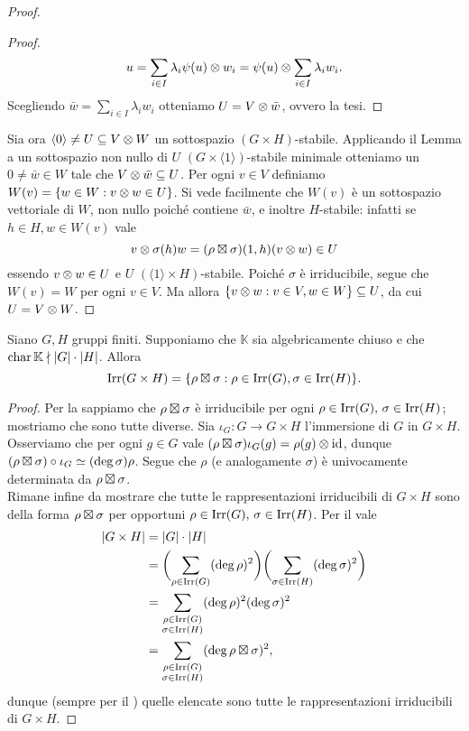 \begin{proof}
\begin{proof}
$$
u=\sum_{i\in I}\lambda_i\psi(u)\otimes w_i=\psi(u)\otimes\sum_{i\in I}\lambda_i w_i.
$$
Scegliendo $\bar{w}=\sum_{i\in I}\lambda_i w_i$ otteniamo $U=V\otimes\bar{w}$, ovvero la tesi.
\end{proof}
Sia ora $\langle0\rangle\neq U\subseteq V\otimes W$ un sottospazio $(G\times H)$-stabile. Applicando il Lemma a un sottospazio non nullo di $U$ $(G\times\langle1\rangle)$-stabile minimale otteniamo un $0\neq\bar{w}\in W$ tale che $V\otimes\bar{w}\subseteq U$. Per ogni $v\in V$ definiamo $W(v)=\{w\in W:v\otimes w\in U\}$. Si vede facilmente che $W(v)$ è un sottospazio vettoriale di $W$, non nullo poiché contiene $\bar{w}$, e inoltre $H$-stabile: infatti se $h\in H\comma w\in W(v)$ vale
$$
v\otimes\sigma(h)w=(\rho\boxtimes\sigma)(1,h)(v\otimes w)\in U
$$
essendo $v\otimes w\in U$ e $U$ $(\langle1\rangle\times H)$-stabile. Poiché $\sigma$ è irriducibile, segue che $W(v)=W$ per ogni $v\in V$. Ma allora $\{v\otimes w:v\in V,w\in W\}\subseteq U$, da cui $U=V\otimes W$.
\end{proof}

\begin{corollary}
Siano $G\comma H$ gruppi finiti. Supponiamo che $\mathbb{K}$ sia algebricamente chiuso e che $\operatorname{char}\mathbb{K}\nmid|G|\cdot|H|$. Allora
$$
\operatorname{Irr}(G\times H)=\{\rho\boxtimes\sigma:\rho\in\operatorname{Irr}(G),\sigma\in\operatorname{Irr}(H)\}.
$$
\end{corollary}
\begin{proof}
Per la  sappiamo che $\rho\boxtimes\sigma$ è irriducibile per ogni $\rho\in\operatorname{Irr}(G),\,\allowbreak\sigma\in\operatorname{Irr}(H)$; mostriamo che sono tutte diverse. Sia $\iota_G:G\to G\times H$ l'immersione di $G$ in $G\times H$. Osserviamo che per ogni $g\in G$ vale $(\rho\boxtimes\sigma)\iota_G(g)=\rho(g)\otimes\operatorname{id}$, dunque $(\rho\boxtimes\sigma)\circ\iota_G\simeq(\deg\sigma)\rho$. Segue che $\rho$ (e analogamente $\sigma$) è univocamente determinata da $\rho\boxtimes\sigma$.\\
Rimane infine da mostrare che tutte le rappresentazioni irriducibili di $G\times H$ sono della forma $\rho\boxtimes\sigma$ per opportuni $\rho\in\operatorname{Irr}(G),\,\allowbreak\sigma\in\operatorname{Irr}(H)$. Per il  vale
\begin{align*}
|G\times H|&=|G|\cdot|H|\\
&=\biggl(\sum_{\rho\in\operatorname{Irr}(G)}(\deg\rho)^2\biggr)\biggl(\sum_{\sigma\in\operatorname{Irr}(H)}(\deg\sigma)^2\biggr)\\
&=\sum_{\substack{\rho\in\operatorname{Irr}(G)\\\sigma\in\operatorname{Irr}(H)}}(\deg\rho)^2(\deg\sigma)^2\\
&=\sum_{\substack{\rho\in\operatorname{Irr}(G)\\\sigma\in\operatorname{Irr}(H)}}(\deg\rho\boxtimes\sigma)^2,
\end{align*}
dunque (sempre per il ) quelle elencate sono tutte le rappresentazioni irriducibili di $G\times H$.
\end{proof}

